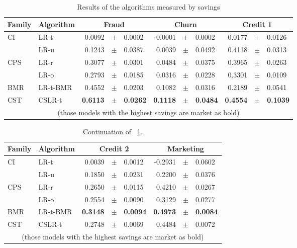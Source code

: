 \begin{table}
    \centering
    \footnotesize
    \begin{tabular}{l l r@{\hskip 0in}c@{\hskip 0in}l r@{\hskip 0in}c@{\hskip 0in}l r@{\hskip 
    0in}c@{\hskip 0in}l  } %
    \hline
    \bf{Family} & \bf{Algorithm} & \multicolumn{3}{c}{\bf{Fraud}} & 
    \multicolumn{3}{c}{\bf{Churn}} & \multicolumn{3}{c}{\bf{Credit 1}} \\ 
    \hline
CI&LR-t & 0.0092 &$\pm$& 0.0002 & -0.0001 &$\pm$& 0.0002 & 0.0177 &$\pm$& 0.0126\\ 
&LR-u & 0.1243 &$\pm$& 0.0387 & 0.0039 &$\pm$& 0.0492 & 0.4118 &$\pm$& 0.0313\\ 
\hline 
CPS&LR-r & 0.3077 &$\pm$& 0.0301 & 0.0484 &$\pm$& 0.0375 & 0.3965 &$\pm$& 0.0263\\ 
&LR-o & 0.2793 &$\pm$& 0.0185 & 0.0316 &$\pm$& 0.0228 & 0.3301 &$\pm$& 0.0109\\ 
\hline 
BMR&LR-t-BMR & 0.4552 &$\pm$& 0.0203 & 0.1082 &$\pm$& 0.0316 & 0.2189 &$\pm$& 0.0541\\ 
\hline 
CST&CSLR-t & \bf{0.6113} &\bf{$\pm$}& \bf{0.0262} & \bf{0.1118} &\bf{$\pm$}& \bf{0.0484} & 
\bf{0.4554} &\bf{$\pm$}& \bf{0.1039}\\ 
\hline
  \multicolumn{11}{c}{(those models with the highest savings are market as bold)}
  \end{tabular}
    \caption{Results of the algorithms measured by savings}
    \label{tab:7:results_savings}
  \end{table}
  
\begin{table}
    \centering
    \footnotesize
    \begin{tabular}{l l r@{\hskip 0in}c@{\hskip 0in}l r@{\hskip 0in}c@{\hskip 0in}l  } %
    \hline
    \bf{Family} & \bf{Algorithm} &  \multicolumn{3}{c}{\bf{Credit 2}} 
& \multicolumn{3}{c}{\bf{Marketing}} \\ 
    \hline
CI&LR-t & 0.0039 &$\pm$& 0.0012 & -0.2931 &$\pm$& 0.0602\\ 
&LR-u & 0.1850 &$\pm$& 0.0231 & 0.2200 &$\pm$& 0.0376\\ 
\hline 
CPS&LR-r & 0.2650 &$\pm$& 0.0115 & 0.4210 &$\pm$& 0.0267\\ 
&LR-o & 0.2554 &$\pm$& 0.0090 & 0.3129 &$\pm$& 0.0277\\ 
\hline 
BMR&LR-t-BMR & \bf{0.3148} &\bf{$\pm$}& \bf{0.0094} & \bf{0.4973} &\bf{$\pm$}& \bf{0.0084}\\ 
\hline 
CST&CSLR-t & 0.2748 &$\pm$& 0.0069 & 0.4484 &$\pm$& 0.0072\\ 
\hline 
  \multicolumn{8}{c}{(those models with the highest savings are market as bold)}
  \end{tabular}
    \caption{Continuation of \tablename{~\ref{tab:7:results_savings}}.}
    \label{tab:7:results_savings2}
  \end{table}

